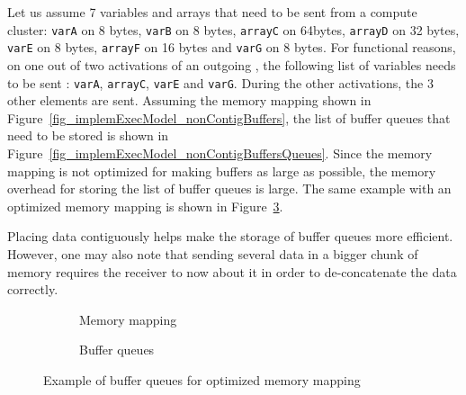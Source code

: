 \documentclass[main.tex]{subfiles}
\begin{document}
\begin{example}
    Let us assume 7 variables and arrays that need to be sent from a compute cluster: \verb+varA+ on 8 bytes, \verb+varB+ on 8 bytes, \verb+arrayC+ on 64bytes, \verb+arrayD+ on 32 bytes, \verb$varE$ on 8 bytes, \verb+arrayF+ on 16 bytes and \verb+varG+ on 8 bytes. For functional reasons, on one out of two activations of an outgoing \PC{}, the following list of variables needs to be sent : \verb+varA+, \verb+arrayC+, \verb$varE$ and \verb+varG+. During the other \PC{} activations, the 3 other elements are sent. Assuming the memory mapping shown in Figure~\ref{fig_implemExecModel_nonContigBuffers}, the list of buffer queues that need to be stored is shown in Figure~\ref{fig_implemExecModel_nonContigBuffersQueues}. Since the memory mapping is not optimized for making buffers as large as possible, the memory overhead for storing the list of buffer queues is large. The same example with an optimized memory mapping is shown in Figure~\ref{fig_implemExecModel_exContigBuffers}. 
\end{example}

Placing data contiguously helps make the storage of buffer queues more efficient. However, one may also note that sending several data in a bigger chunk of memory requires the receiver to now about it in order to de-concatenate the data correctly.



\begin{figure}
    \centering
    \begin{subfigure}[b]{0.45\linewidth}
        \centering
        \scalebox{0.7}{}
        \caption{Memory mapping}
        \label{fig_implemExecModel_contigBuffers}
    \end{subfigure}\hspace{6mm}
    \begin{subfigure}[b]{0.45\linewidth}
        \centering
        \scalebox{0.7}{}
        \caption{Buffer queues}
        \label{fig_implemExecModel_contigBuffersQueues}
    \end{subfigure}
    \caption{Example of buffer queues for optimized memory mapping}
    \label{fig_implemExecModel_exContigBuffers}
\end{figure}
\end{document}

